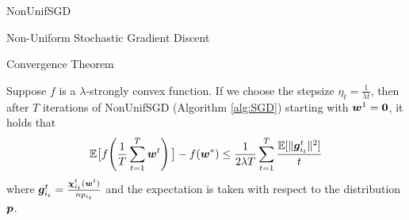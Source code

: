 \begin{frame}{NonUnifSGD}
\begin{algorithm}[H]
    \label{alg:SGD}
    \caption{Non-Uniform Stochastic Gradient Discent}
    \SetAlgoLined
\end{algorithm}
\end{frame}


\begin{frame}{Convergence Theorem}
\begin{theorem}
\label{theorem:basicSGD}
 Suppose $f$ is a $\lambda$-strongly convex function. If we choose the stepsize $\eta_t = \frac{1}{\lambda t }$, then after $T$ iterations of NonUnifSGD (Algorithm \ref{alg:SGD}) starting with $\bm{w}^{1}=\bm{0}$, it holds that
    \[
        \mathbb{E}\big[ f\!\left(\frac1T\sum_{t=1}^T \bm{w}^{t} \right) \big] - f(\bm{w}^*) \le \frac{1}{2\lambda T}\sum_{t=1}^T \frac{\mathbb{E}[\|\bm{g}_{i_t}^t\|^2]}{t}
    \]
    where $\bm{g}_{i_t}^t=\frac{\bm{\chi}_{i_t}^t(\bm{w}^{t})}{np_{i_t}}$ and the expectation is taken with respect to the distribution $\bm{p}$.
\end{theorem}
\end{frame}

